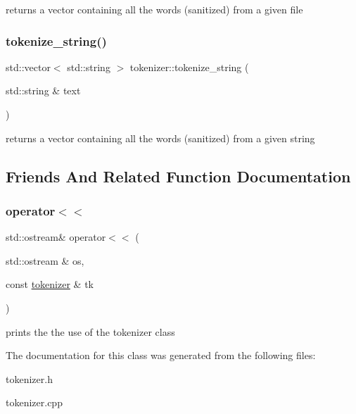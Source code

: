 returns a vector containing all the words (sanitized) from a given file \mbox{\label{classtokenizer_a9fbc8f511d0eeb0ca2f0333612c99a2a}} 
\subsubsection{\texorpdfstring{tokenize\+\_\+string()}{tokenize\_string()}}
{\footnotesize\ttfamily std\+::vector$<$ std\+::string $>$ tokenizer\+::tokenize\+\_\+string (\begin{DoxyParamCaption}\item[{std\+::string \&}]{text }\end{DoxyParamCaption})\hspace{0.3cm}{\ttfamily [static]}}

returns a vector containing all the words (sanitized) from a given string 

\subsection{Friends And Related Function Documentation}
\mbox{\label{classtokenizer_af8ab6eab63d97d86eb0e8a22eb94aafc}} 
\subsubsection{\texorpdfstring{operator$<$$<$}{operator<<}}
{\footnotesize\ttfamily std\+::ostream\& operator$<$$<$ (\begin{DoxyParamCaption}\item[{std\+::ostream \&}]{os,  }\item[{const \hyperlink{classtokenizer}{tokenizer} \&}]{tk }\end{DoxyParamCaption})\hspace{0.3cm}{\ttfamily [friend]}}

prints the the use of the tokenizer class 

The documentation for this class was generated from the following files\+:\begin{DoxyCompactItemize}
\item 
tokenizer.\+h\item 
tokenizer.\+cpp\end{DoxyCompactItemize}
